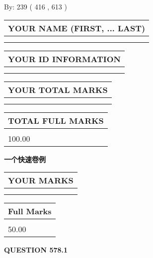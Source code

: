 \documentclass{ctexart}
\begin{document}
   
\hspace{1.0in} By: 
 239 ( 416 ,  613 )
   
   
   
   
\newpage 
\setcounter{page}{ 
   578001 } 
   
   
   
   
\noindent\begin{tabular}{|l|}
\hline
YOUR NAME (FIRST, ... LAST)  \\
\hline
 \\ 
 \\ 
\hline
\end{tabular}
\hspace{0.05in} \begin{tabular}{|l|}
\hline
 YOUR   ID   INFORMATION  \\
\hline
 \\ 
 \\ 
\hline
\end{tabular}
   
   
\vspace{0.2in}\noindent\begin{tabular}{|l|}
\hline
YOUR TOTAL MARKS  \\
\hline
 \\ 
 \\ 
\hline
\end{tabular}
\hspace{0.05in} \begin{tabular}{|l|}
\hline
TOTAL FULL MARKS  \\
\hline
 \\ 
100.00 \\
\hline
\end{tabular}
   
   
 \vspace{0.2in}
{\LARGE {\textbf{ 一个快速卷例}}}
   
   
  
\vspace{0.2in}
  
\noindent\begin{tabular}{|l|}
\hline
 YOUR MARKS  \\
\hline
 \\ 
 \\ 
\hline
\end{tabular}
\hspace{0.05in} \begin{tabular}{|l|}
\hline
 Full Marks  \\
\hline
 \\ 
50.00 \\
\hline
\end{tabular}
{\textbf{\Large{QUESTION
578.1 
}}}
  
\end{document}
